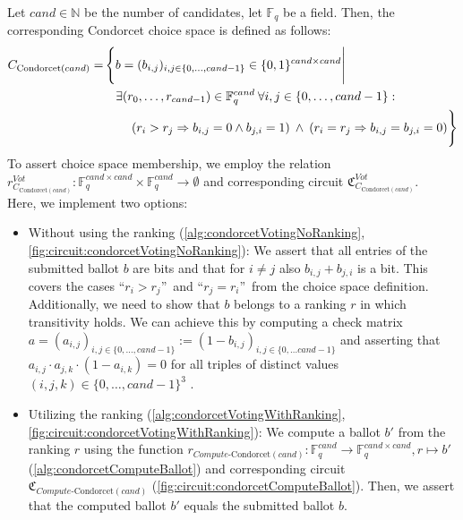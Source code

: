 \begin{definition}
    Let $cand\in\mathbb{N}$ be the number of candidates, let $\mathbb{F}_q$ be a field.
    Then, the corresponding Condorcet choice space is defined as follows:
    {\setlength{\mathindent}{2pt}
    \begin{align*}
        C_{\text{Condorcet}(cand)}=& \left\{b=(b_{i,j})_{i,j\in\{0,\dots, cand-1\}}\in \{0,1\}^{cand\times cand}\Bigg| \right.\\
        & \quad\exists (r_0,\dots, r_{cand-1})\in\mathbb{F}_q^{cand}\:\forall i, j\in\{0,\dots, cand-1\}:\\
        & \quad\quad \left. \vphantom{\Bigg|} (r_i>r_j\Rightarrow b_{i,j}=0 \land b_{j,i} = 1)\:\land\:(r_i=r_j\Rightarrow b_{i,j}=b_{j,i}=0)\right\} \\
    \end{align*}
    }
    To assert choice space membership, we employ the relation $r_{C_{\text{Condorcet}(cand)}}^{Vot}:\mathbb{F}_q^{cand\times cand}\times\mathbb{F}_q^{cand}\to\emptyset$ and corresponding circuit $\mathfrak{C}_{C_{\text{Condorcet}(cand)}}^{Vot}$.\\
    Here, we implement two options:
    \begin{itemize}
        \item Without using the ranking (\cref{alg:condorcetVotingNoRanking}, \cref{fig:circuit:condorcetVotingNoRanking}):
        We assert that all entries of the submitted ballot $b$ are bits and that for $i\neq j$ also $b_{i,j}+b_{j,i}$ is a bit.
        This covers the cases ``$r_i>r_j$''\ and ``$r_j=r_i$''\ from the choice space definition. 
        Additionally, we need to show that $b$ belongs to a ranking $r$ in which transitivity holds.
        We can achieve this by computing a check matrix $a=(a_{i,j})_{i,j\in\{0,\dots, cand-1\}}:=(1-b_{i,j})_{i,j\in\{0,\dots cand-1\}}$ and asserting that $a_{i,j}\cdot a_{j,k}\cdot (1-a_{i,k})=0$ for all triples of distinct values $(i,j,k)\in\{0,\dots, cand-1\}^3$ \cite{huber_zk-snarks_2025}.
        \item Utilizing the ranking (\cref{alg:condorcetVotingWithRanking}, \cref{fig:circuit:condorcetVotingWithRanking}): 
        We compute a ballot $b'$ from the ranking $r$ using the function $r_{Compute\text{-Condorcet}(cand)}:\mathbb{F}_q^{cand}\to\mathbb{F}_q^{cand\times cand}, r\mapsto b'$ (\cref{alg:condorcetComputeBallot}) and corresponding circuit $\mathfrak{C}_{Compute\text{-Condorcet}(cand)}$ (\cref{fig:circuit:condorcetComputeBallot}).
        Then, we assert that the computed ballot $b'$ equals the submitted ballot $b$.
    \end{itemize}
\end{definition}

